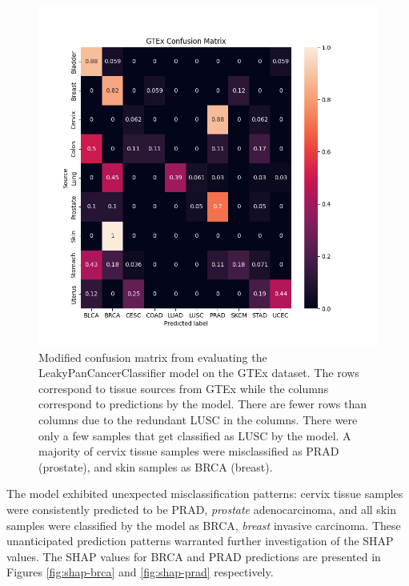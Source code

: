 \documentclass{l4proj}
\begin{document}
\begin{figure}[h]
    \centering
    \includegraphics[width=0.8\linewidth]{images/confusion_matrix.png}
    \caption{Modified confusion matrix from evaluating the LeakyPanCancerClassifier model on the GTEx dataset. The rows correspond to tissue sources from GTEx while the columns correspond to predictions by the model. There are fewer rows than columns due to the redundant LUSC in the columns. There were only a few samples that get classified as LUSC by the model. A majority of cervix tissue samples were misclassified as PRAD (prostate), and skin samples as BRCA (breast).}
    \label{fig:conf-mat-gtex}
\end{figure}

The model exhibited unexpected misclassification patterns: cervix tissue samples were consistently predicted to be PRAD, \emph{prostate} adenocarcinoma, and all skin samples were classified by the model as BRCA, \emph{breast} invasive carcinoma. These unanticipated prediction patterns warranted further investigation of the SHAP values. The SHAP values for BRCA and PRAD predictions are presented in Figures \ref{fig:shap-brca} and \ref{fig:shap-prad} respectively.
\end{document}

